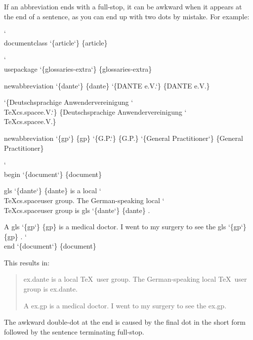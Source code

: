 \documentclass[titlepage=false,fontsize=12pt,captions=tableheading]{scrreprt}
\makeatletter
\newenvironment{result}%
{%
 \renewcommand{\glslinkpresetkeys}{\setkeys{glslink}{hyper=false,local}}%
 \begin{quotation}%
 \marginpar
  [\raisebox{-2.5ex}{\ding{43}}]%
  {\raisebox{-2.5ex}{\reflectbox{\ding{43}}}}%
 \ignorespaces
}
{\end{quotation}\ignorespacesafterend}
\newcommand*{\csfmtfont}[1]{\texttt{#1}}
\newcommand*{\abbrstylefmt}[1]{\texorpdfstring{\textsf{\color{style}#1}}{#1}}
\newcommand*{\catattrfmt}[1]{\texorpdfstring{\textsf{\color{attribute}#1}}{#1}}
\newcommand*{\marg}[1]{\texorpdfstring
 {\discretionary{}{}{}\char`\{#1\char`\} }%
 {\{#1\}}%
}
\newenvironment{codeenv}
 {%
 \renewcommand{\glslinkpresetkeys}{\setkeys{glslink}{noindex}}%
   \def\cmd{\char`\\}%
   \def\comment##1{\textcolor{comment}{\%\ ##1}}%
   \renewcommand*{\catattrfmt}[1]{\textcolor{attribute}{##1}}%
   \renewcommand*{\abbrstylefmt}[1]{\textcolor{style}{##1}}%
   \renewcommand*{\csfmtfont}[1]{\textcolor{cs}{##1}}%
    \begin{flushleft}\textcolor{lightgray}{\hrulefill}\par\nopagebreak
     \medskip\nopagebreak
     \ttfamily\obeylines\frenchspacing\@vobeyspaces}
 {\nopagebreak\textcolor{lightgray}{\hrulefill}%
  \end{flushleft}\ignorespacesafterend}
\newcommand{\idx}{\gls}
\let\texorpdfstring\@secondoftwo
\makeatother
\begin{document}
If an abbreviation ends with a \idx{full-stop}, it can be awkward
when it appears at the end of a sentence, as you can end up with two
dots by mistake. For example:
\begin{codeenv}
\cmd{documentclass}\marg{article}
\strut
\cmd{usepackage}\marg{glossaries-extra}
\strut
\gls{newabbreviation}\marg{dante}\marg{DANTE e.V.}
\marg{Deutschsprachige Anwendervereinigung \cmd{TeX}\gls{cs.space}e.V.}
\strut
\gls{newabbreviation}\marg{gp}\marg{G.P.}\marg{General Practitioner}
\strut
\cmd{begin}\marg{document}
\gls{gls}\marg{dante} is a local \cmd{TeX}\gls{cs.space}user group.
The German-speaking local \cmd{TeX}\gls{cs.space}user group is \gls{gls}\marg{dante}.
\strut
A \gls{gls}\marg{gp} is a medical doctor.
I went to my surgery to see the \gls{gls}\marg{gp}.
\cmd{end}\marg{document}
\end{codeenv}
This results in:
\begin{result}
\gls{ex.dante} is a local \TeX\ user group.
The German-speaking local \TeX\ user group is \gls{ex.dante}\relax.

A \gls{ex.gp} is a medical doctor.
I went to my surgery to see the \gls{ex.gp}\relax.
\end{result}
The awkward double-dot at the end is caused by the final dot in the
short form followed by the sentence terminating \idx{full-stop}.
\end{document}
